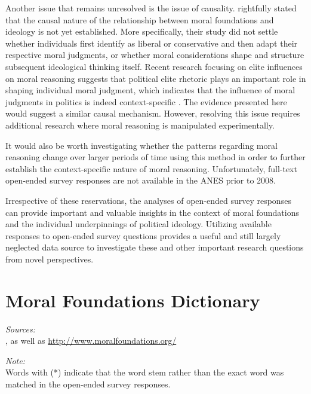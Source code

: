 \documentclass[12pt]{article}
\begin{document}
Another issue that remains unresolved is the issue of causality. \citet{graham2009liberals} rightfully stated that the causal nature of the relationship between moral foundations and ideology is not yet established. More specifically, their study did not settle whether individuals first identify as liberal or conservative and then adapt their respective moral judgments, or whether moral considerations shape and structure subsequent ideological thinking itself. Recent research focusing on elite influences on moral reasoning suggests that political elite rhetoric plays an important role in shaping individual moral judgment, which indicates that the influence of moral judgments in politics is indeed context-specific \citep[see for example][]{clifford2013words,clifford2015concerns}. The evidence presented here would suggest a similar causal mechanism. However, resolving this issue requires additional research where moral reasoning is manipulated experimentally.

It would also be worth investigating whether the patterns regarding moral reasoning change over larger periods of time using this method in order to further establish the context-specific nature of moral reasoning. Unfortunately, full-text open-ended survey responses are not available in the ANES prior to 2008.

Irrespective of these reservations, the analyses of open-ended survey responses can provide important and valuable insights in the context of moral foundations and the individual underpinnings of political ideology. Utilizing available responses to open-ended survey questions provides a useful and still largely neglected data source to investigate these and other important research questions from novel perspectives.


\clearpage\flushleft\footnotesize\singlespacing
\appendices
\section{Moral Foundations Dictionary}
\renewcommand\thefigure{\thesection.\arabic{figure}}
\renewcommand\thetable{\thesection.\arabic{table}}
\setcounter{figure}{0}
\setcounter{table}{0}

\textit{Sources:}\\
\citet{graham2009liberals}, as well as \url{http://www.moralfoundations.org/}
\vspace{.5cm}

\textit{Note:}\\
Words with (*) indicate that the word stem rather than the exact word was matched in the open-ended survey responses.
\vspace{.5cm}
\end{document}
